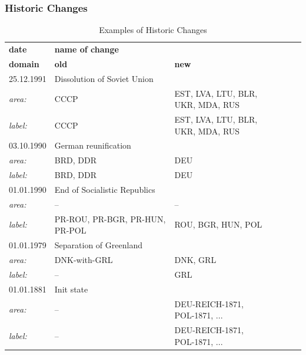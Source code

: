 

\subsubsection{Historic Changes} %
\label{ssub:historic_changes}

\begin{table}[ht]
\begin{small}
  \caption{Examples of Historic Changes}
  \label{tab:changes}
  \begin{center}
    \begin{tabular}{lllllll}
    \hline

    \hline
    \textbf{date} & \textbf{name of change} & \\
    \textbf{domain} & \textbf{old} & \textbf{new} \\
    \hline
    25.12.1991 & Dissolution of Soviet Union & \\
    \textit{area:} & CCCP & \pbox{5cm}{EST, LVA, LTU, BLR, \\ UKR, MDA, RUS} \\
    \textit{label:} & CCCP & \pbox{5cm}{EST, LVA, LTU, BLR, \\ UKR, MDA, RUS }\\
    \hline
    03.10.1990 & German reunification & \\
    \textit{area:} & BRD, DDR & DEU \\
    \textit{label:} & BRD, DDR & DEU \\
    \hline
    01.01.1990 & End of Socialistic Republics & \\
    \textit{area:} & -- & -- \\
    \textit{label:} & PR-ROU, PR-BGR, PR-HUN, PR-POL & ROU, BGR, HUN, POL \\
    \hline
    01.01.1979 & Separation of Greenland & \\
    \textit{area:} & DNK-with-GRL & DNK, GRL \\
    \textit{label:} & -- & GRL \\
    \hline
    01.01.1881 & Init state & \\
    \textit{area:} & -- & DEU-REICH-1871, POL-1871, ... \\
    \textit{label:} & -- & DEU-REICH-1871, POL-1871, ... \\
    \hline

    \hline
    \end{tabular}
  \end{center}
\end{small}
\end{table}

